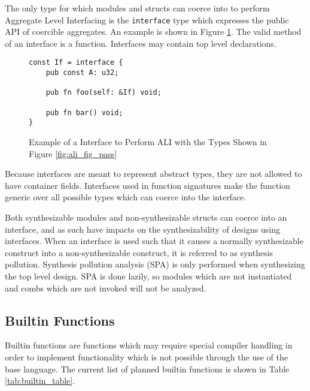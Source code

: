 \documentclass[10pt]{article}
\begin{document}
The only type for which modules and structs can coerce into to perform Aggregate Level Interfacing
is the \verb|interface| type which expresses the public API of coercible aggregates. An example is
shown in Figure \ref{fig:ali_interface}. The valid method of an interface is a function. Interfaces
may contain top level declarations.

\begin{figure}[H]
	\begin{verbatim}
const If = interface {
    pub const A: u32;

    pub fn foo(self: &If) void;

    pub fn bar() void;
}
    \end{verbatim}
	\vspace*{-5mm}
	\caption{Example of a Interface to Perform ALI with the Types Shown in Figure \ref{fig:ali_fig_pass}}
	\label{fig:ali_interface}
\end{figure}

Because interfaces are meant to represent abstract types, they are not allowed to have container
fields. Interfaces used in function signatures make the function generic over all possible types
which can coerce into the interface.

Both synthesizable modules and non-synthesizable structs can coerce into an interface, and as such
have impacts on the synthesizability of designs using interfaces. When an interface is used such
that it causes a normally synthesizable construct into a non-synthesizable construct, it is referred
to as synthesis pollution. Synthesis pollution analysis (SPA) is only performed when synthesizing the top
level design. SPA is done lazily, so modules which are not instantiated and combs which are not
invoked will not be analyzed.

\subsection{Builtin Functions}
Builtin functions are functions which may require special compiler handling in order to implement
functionality which is not possible through the use of the base language. The current list of
planned builtin functions is shown in Table \ref{tab:builtin_table}.
\end{document}
